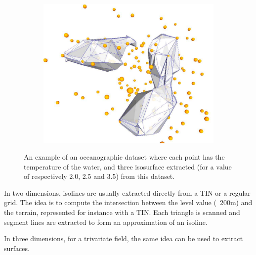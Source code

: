 \begin{figure}
\begin{subfigure}[b]{0.3\linewidth}
    \centering
    \includegraphics[width=\textwidth]{figs/isosurface3}
    \caption{}
  \end{subfigure}
\caption{An example of an oceanographic dataset where each point has the temperature of the water, and three isosurface extracted (for a value of respectively 2.0, 2.5 and 3.5) from this dataset.}
\label{fig:isosurface}
\end{figure}

%

In two dimensions, isolines are usually extracted directly from a TIN or a regular grid. 
The idea is to compute the intersection between the level value (\eg\ 200m) and the terrain, represented for instance with a TIN\@. 
Each triangle is scanned and segment lines are extracted to form an approximation of an isoline.

%

In three dimensions, for a trivariate field, the same idea can be used to extract surfaces.

%

